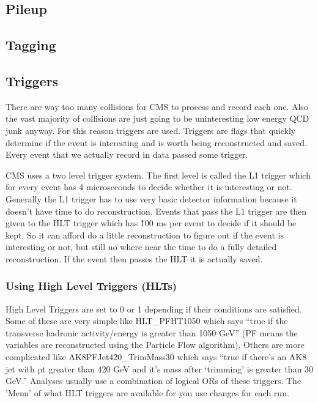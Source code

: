 \subsection{Pileup}

\subsection{Tagging}

\subsection{Triggers}

There are way too many collisions for CMS to process and record each one. Also the vast majority of collisions are just going to be uninteresting low energy QCD junk anyway. 
For this reason triggers are used. Triggers are flags that quickly determine if the event is interesting and is worth being reconstructed and saved. 
Every event that we actually record in data passed some trigger.

CMS uses a two level trigger system. 
The first level is called the L1 trigger which for every event has 4 microseconds to decide whether it is interesting or not. 
Generally the L1 trigger has to use very basic detector information because it doesn't have time to do reconstruction. 
Events that pass the L1 trigger are then given to the HLT trigger which has \~100 ms per event to decide if it should be kept. 
So it can afford do a little reconstruction to figure out if the event is interesting or not, but still no where near the time to do a fully detailed reconstruction. 
If the event then passes the HLT it is actually saved. 

\subsubsection*{Using High Level Triggers (HLTs)}
High Level Triggers are set to 0 or 1 depending if their conditions are satisfied. Some of these are very simple like HLT\_PFHT1050 which says ``true if the transverse hadronic activity/energy is greater than 1050 GeV'' (PF means the variables are reconstructed using the Particle Flow algorithm). Others are more complicated like AK8PFJet420\_TrimMass30 which says ``true if there's an AK8 jet with pt greater than 420 GeV and it's mass after `trimming' is greater than 30 GeV.'' Analyses usually use a combination of logical ORs of these triggers.
The 'Menu' of what HLT triggers are available for you use changes for each run.

